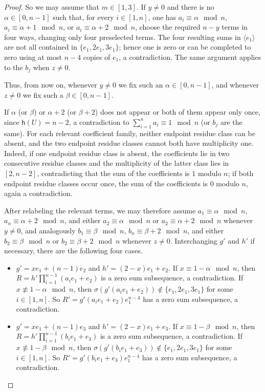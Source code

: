 \documentclass[a4paper, 10pt]{amsart}
\theoremstyle{plain}
\theoremstyle{definition}
\numberwithin{equation}{section}
\begin{document}
{\begin{proof}
	So we may assume that $m\in[1,3]$. If $y\ne0$ and there is no $\alpha\in[0,n-1]$ such that, for every $i\in[1,n]$, one has $a_i\equiv\alpha\mod n$, $a_i\equiv\alpha+1\mod n$, or $a_i\equiv\alpha+2\mod n$, choose the required $n-y$ terms in four ways, changing only four preselected terms. The four resulting sums in $\langle e_1\rangle$ are not all contained in $\{e_1,2e_1,3e_1\}$; hence one is zero or can be completed to zero using at most $n-4$ copies of $e_1$, a contradiction. The same argument applies to the $b_j$ when $z\ne0$.
	
	Thus, from now on, whenever $y\ne0$ we fix such an $\alpha\in[0,n-1]$, and whenever $z\ne0$ we fix such a $\beta\in[0,n-1]$.
	
	If $\alpha$ (or $\beta$) or $\alpha+2$ (or $\beta+2$) does not appear or both of them appear only once, since $\mathsf h(U)=n-2$, a contradiction to $\sum_{i=1}^n a_i \equiv 1 \mod{n}$ (or $b_j$ are the same).
	For each relevant coefficient family, neither endpoint residue class can be absent, and the two endpoint residue classes cannot both have multiplicity one. Indeed, if one endpoint residue class is absent, the coefficients lie in two consecutive residue classes and the multiplicity of the latter class lies in $[2,n-2]$, contradicting that the sum of the coefficients is $1$ modulo $n$; if both endpoint residue classes occur once, the sum of the coefficients is $0$ modulo $n$, again a contradiction.
	
	
After relabeling the relevant terms, we may therefore assume $a_1\equiv\alpha\mod n$, $a_n\equiv\alpha+2\mod n$, and either $a_2\equiv\alpha\mod n$ or $a_2\equiv\alpha+2\mod n$ whenever $y\ne0$, and analogously $b_1\equiv\beta\mod n$, $b_n\equiv\beta+2\mod n$, and either $b_2\equiv\beta\mod n$ or $b_2\equiv\beta+2\mod n$ whenever $z\ne0$. Interchanging $g'$ and $h'$ if necessary, there are the  following four cases.
	
	\begin{itemize}
		\item[(i)] $g'=xe_1+(n-1)e_2$ and $h'=(2-x)e_1+e_2$. 
		If $x\equiv1-\alpha\mod n$, then $R=h'\prod_{i=1}^{n-1} (a_ie_1+e_2)$ is a zero sum subsequence, a contradiction. 
		If $x\not\equiv1-\alpha\mod n$, then $\sigma(g'(a_ie_1+e_2))\notin \{e_1,2e_1,3e_1\}$ for some $i\in [1,n]$. So $R'=g'(a_ie_1+e_2)e_1^{n-4}$ has a zero sum subsequence, a contradiction.
		
		\item[(ii)] $g'=xe_1+(n-1)e_3$ and $h'=(2-x)e_1+e_3$. 
		If $x\equiv1-\beta\mod n$, then $R=h'\prod_{i=1}^{n-1} (b_ie_1+e_3)$ is a zero sum subsequence, a contradiction.
		If $x\not\equiv1-\beta\mod n$, then $\sigma(g'(b_ie_1+e_3))\notin \{e_1,2e_1,3e_1\}$ for some $i\in [1,n]$. So $R'=g'(b_ie_1+e_3)e_1^{n-4}$ has a zero sum subsequence, a contradiction.
		

\end{itemize}
\end{proof}}
\end{document}
